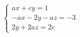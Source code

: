\grupo{}

\begin{equation}
	\begin{cases}
		ax + cy = 1\\
		-ax - 2y -az = -3\\
		2y + 2az = 2c
	\end{cases}
\end{equation}
